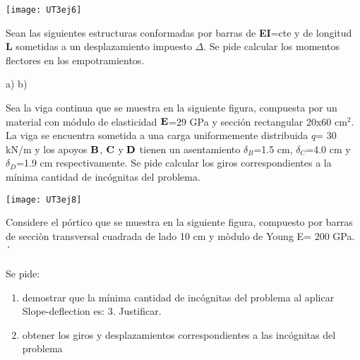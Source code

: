 \begin{center}
	\texttt{[image: UT3ej6]}
\end{center}


\ejercicio


Sean las siguientes estructuras conformadas por barras de \textbf{EI}=cte y de longitud \textbf{L} sometidas a un desplazamiento impuesto $\Delta$. Se pide calcular los momentos flectores en los empotramientos.


\begin{center}
	\def\svgwidth{0.45\textwidth}
	a) 
	\def\svgwidth{0.45\textwidth}
	b) 
\end{center}

\ejercicio

Sea la viga continua que se muestra en la siguiente figura, compuesta por un material con módulo de elasticidad $\bf E$=29 GPa y sección rectangular 20x60 cm$^2$. La viga se encuentra sometida a una carga uniformemente distribuida $q$= 30 kN/m y los apoyos $\bf B$, $\bf C$ y $\bf D$ tienen un asentamiento $\delta_B$=1.5 cm, $\delta_C$=4.0 cm y $\delta_D$=1.9 cm respectivamente. Se pide calcular los giros correspondientes a la mínima cantidad de incógnitas del problema.

\begin{center}
	\texttt{[image: UT3ej8]}
\end{center}

\ejercicio

Considere el pórtico que se muestra en la siguiente figura, compuesto por barras de secciòn transversal cuadrada de lado 10 cm y mòdulo de Young E= 200 GPa. 
´
\begin{center}
	 \def\svgwidth{0.7\textwidth}
	
\end{center}

Se pide:

\begin{enumerate}
	\item demostrar que la mínima cantidad de incógnitas del problema al aplicar Slope-deflection es: 3. Justificar.
	\item obtener los giros y desplazamientos correspondientes a las incógnitas del problema
\end{enumerate}
 
